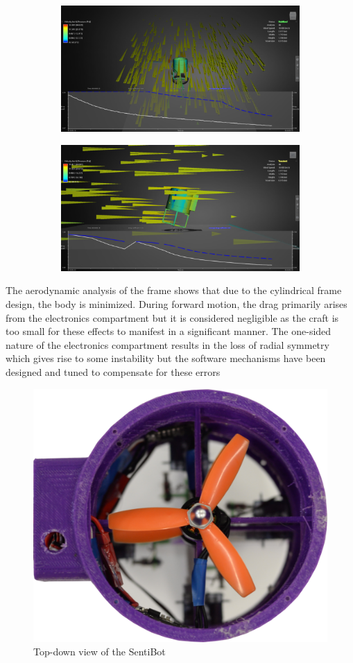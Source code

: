 \documentclass[12pt]{article}
\begin{document}
\begin{figure}
	\centering
	\begin{subfigure}{0.5\textwidth}
		\centering
		\includegraphics[width=0.4\linewidth]{aerodynamic-1.png}
		\caption{}
		\label{fig:aerodynamic-1}
	\end{subfigure}
	\begin{subfigure}{0.5\textwidth}
		\centering
		\includegraphics[width=0.4\linewidth]{aerodynamic-2.png}
		\caption{}
		\label{fig:aerodynamic-2}
	\end{subfigure}
\end{figure}

The aerodynamic analysis of the frame shows that due to the cylindrical frame design, the body is minimized. During forward motion, the drag primarily arises from the electronics compartment but it is considered negligible as the craft is too small for these effects to manifest in a significant manner. The one-sided nature of the electronics compartment results in the loss of radial symmetry which gives rise to some instability but the software mechanisms have been designed and tuned to compensate for these errors

\begin{figure}
	\includegraphics[width=\linewidth]{sb-topdown.png}
	\caption{Top-down view of the SentiBot}
	\label{fig:sb-topdown}
\end{figure}
\end{document}
